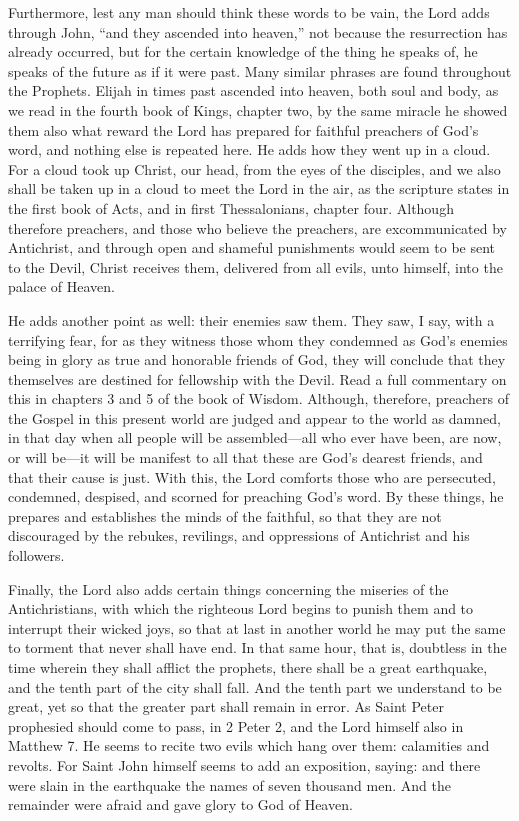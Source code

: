 Furthermore, lest any man should think these words to be vain, the Lord adds through John, “and they ascended into heaven,” not because the resurrection has already occurred, but for the certain knowledge of the thing he speaks of, he speaks of the future as if it were past. Many similar phrases are found throughout the Prophets. Elijah in times past ascended into heaven, both soul and body, as we read in the fourth book of Kings, chapter two, by the same miracle he showed them also what reward the Lord has prepared for faithful preachers of God’s word, and nothing else is repeated here. He adds how they went up in a cloud. For a cloud took up Christ, our head, from the eyes of the disciples, and we also shall be taken up in a cloud to meet the Lord in the air, as the scripture states in the first book of Acts, and in first Thessalonians, chapter four. Although therefore preachers, and those who believe the preachers, are excommunicated by Antichrist, and through open and shameful punishments would seem to be sent to the Devil, Christ receives them, delivered from all evils, unto himself, into the palace of Heaven.

He adds another point as well: their enemies saw them. They saw, I say, with a terrifying fear, for as they witness those whom they condemned as God’s enemies being in glory as true and honorable friends of God, they will conclude that they themselves are destined for fellowship with the Devil. Read a full commentary on this in chapters 3 and 5 of the book of Wisdom. Although, therefore, preachers of the Gospel in this present world are judged and appear to the world as damned, in that day when all people will be assembled—all who ever have been, are now, or will be—it will be manifest to all that these are God’s dearest friends, and that their cause is just. With this, the Lord comforts those who are persecuted, condemned, despised, and scorned for preaching God’s word. By these things, he prepares and establishes the minds of the faithful, so that they are not discouraged by the rebukes, revilings, and oppressions of Antichrist and his followers.

Finally, the Lord also adds certain things concerning the miseries of the Antichristians, with which the righteous Lord begins to punish them and to interrupt their wicked joys, so that at last in another world he may put the same to torment that never shall have end. In that same hour, that is, doubtless in the time wherein they shall afflict the prophets, there shall be a great earthquake, and the tenth part of the city shall fall. And the tenth part we understand to be great, yet so that the greater part shall remain in error. As Saint Peter prophesied should come to pass, in 2 Peter 2, and the Lord himself also in Matthew 7. He seems to recite two evils which hang over them: calamities and revolts. For Saint John himself seems to add an exposition, saying: and there were slain in the earthquake the names of seven thousand men. And the remainder were afraid and gave glory to God of Heaven.

